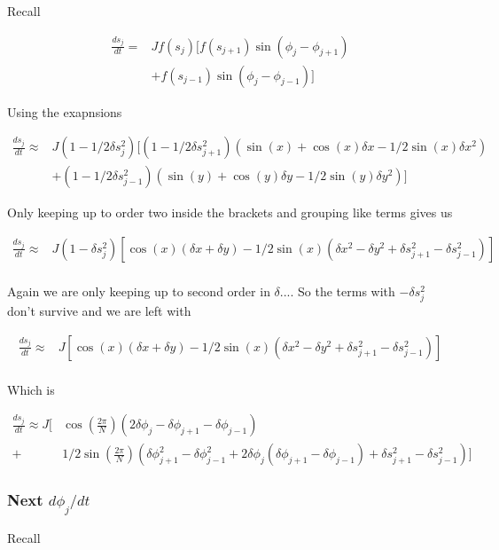 \documentclass{article}
\begin{document}
Recall

\begin{align*}
    \frac{ds_j}{dt} = &Jf(s_j)[f(s_{j+1})\sin(\phi_j - \phi_{j+1})\\
                      &+f(s_{j-1})\sin(\phi_j - \phi_{j-1})]
\end{align*}

Using the exapnsions

\begin{align*}
    \frac{ds_j}{dt} \approx &J(1-1/2\delta s_j^2)[(1-1/2\delta s_{j+1}^2)(\sin(x) + \cos(x)\delta x - 1/2\sin(x)\delta x^2)\\
                      &+(1-1/2\delta s_{j-1}^2)(\sin(y) + \cos(y)\delta y - 1/2\sin(y)\delta y^2)]
\end{align*}

Only keeping up to order two inside the brackets and grouping like terms gives us

\begin{align*}
    \frac{ds_j}{dt} \approx &J(1-\delta s_j^2)[\cos(x)(\delta x + \delta y) - 1/2\sin(x)(\delta x^2 - \delta y^2 + \delta s_{j+1}^2 - \delta s_{j-1}^2)]\\
\end{align*}

Again we are only keeping up to second order in $\delta ...$. So the terms with $-\delta s_j^2$ don't survive and we are left with 

\begin{align*}
    \frac{ds_j}{dt} \approx &J[\cos(x)(\delta x + \delta y) - 1/2\sin(x)(\delta x^2 - \delta y^2 + \delta s_{j+1}^2 - \delta s_{j-1}^2)]\\
\end{align*}

Which is

\begin{align*}
    \frac{ds_j}{dt} \approx J[&\cos(\frac{2\pi}{N})(2\delta\phi_{j} - \delta\phi_{j+1} - \delta\phi_{j-1}) \\
                                +&1/2\sin(\frac{2\pi}{N})(\delta\phi_{j+1}^2 - \delta\phi_{j-1}^2 + 2\delta\phi_{j}(\delta\phi_{j+1} - \delta\phi_{j-1}) + \delta s_{j+1}^2 - \delta s_{j-1}^2)]
\end{align*}

\subsubsection{Next $d\phi_j/dt$}

Recall
\end{document}
